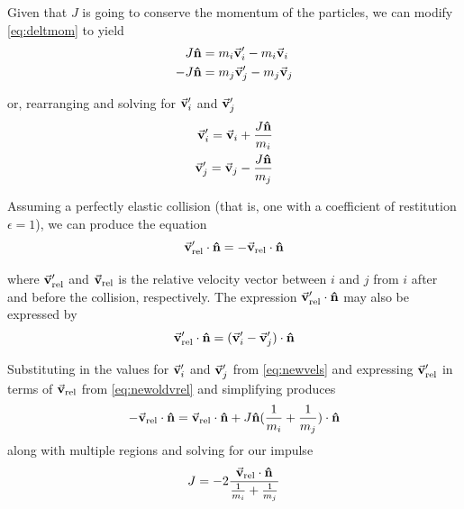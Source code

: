 \documentclass[12pt, twoside, letterpaper]{article}
\begin{document}
\noindent Given that $J$ is going to conserve the momentum of the particles, we can modify \eqref{eq:deltmom} to yield
\begin{subequations} \label{eq:impulsemom}
	\begin{align}
		 J \vu{n} & = m_i\va{v}_i^\prime - m_i\va{v}_i \label{eq:impulsei}  \\
		-J \vu{n} & = m_j\va{v}_j^\prime - m_j\va{v}_j \label{eq:impulsej}
	\end{align}
\end{subequations}

\noindent or, rearranging and solving for $\va{v}_i^\prime$ and $\va{v}_j^\prime$
\begin{subequations} \label{eq:newvels}
	\begin{align}
		 \va{v}_i^\prime = \va{v}_i + \dfrac{J \vu{n}}{m_i} \label{eq:newvi} \\
		 \va{v}_j^\prime = \va{v}_j - \dfrac{J \vu{n}}{m_j} \label{eq:newvj}
	\end{align}
\end{subequations}

Assuming a perfectly elastic collision (that is, one with a coefficient of restitution $\epsilon = 1$), we can produce the equation
\begin{equation} \label{eq:newoldvrel}
\va{v}_{\text{rel}}^\prime \cdot \vu{n} = -\va{v}_{\text{rel}} \cdot \vu{n} 
\end{equation}

\noindent where $\va{v}_{\text{rel}}^\prime$ and $\va{v}_{\text{rel}}$ is the relative velocity vector between $i$ and $j$ from $i$ after and before the collision, respectively. The expression $\va{v}_{\text{rel}}^\prime \cdot \vu{n}$ may also be expressed by
\begin{equation} \label{eq:vreldiff}
\va{v}_{\text{rel}}^\prime \cdot \vu{n} = (\va{v}_i^\prime - \va{v}_j^\prime) \cdot \vu{n}
\end{equation}

\noindent Substituting in the values for $\va{v}_i^\prime$ and $\va{v}_j^\prime$ from \eqref{eq:newvels} and expressing $\va{v}_{\text{rel}}^\prime$ in terms of $\va{v}_{\text{rel}}$ from \eqref{eq:newoldvrel} and simplifying produces
\begin{equation}
-\va{v}_{\text{rel}} \cdot \vu{n} = \va{v}_{\text{rel}} \cdot \vu{n} + J\vu{n}(\dfrac{1}{m_i} + \dfrac{1}{m_j}) \cdot \vu{n}
\end{equation}
along with multiple regions
\noindent and solving for our impulse
\begin{equation} \label{eq:impulse}
J = -2 \dfrac{\va{v}_{\text{rel}} \cdot \vu{n}}{\frac{1}{m_i}+\frac{1}{m_j}}
\end{equation}
\end{document}
